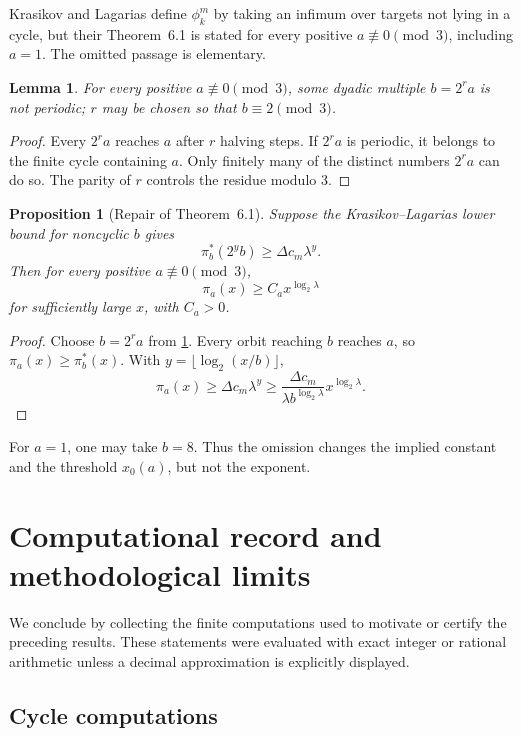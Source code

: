 \documentclass[11pt]{amsart}
\numberwithin{equation}{section}
\newtheorem{proposition}[theorem]{Proposition}
\newtheorem{lemma}[theorem]{Lemma}
\begin{document}
Krasikov and Lagarias define $\phi_k^m$ by taking an infimum over targets not lying in a cycle, but their Theorem~6.1 is stated for every positive $a\not\equiv0\pmod3$, including $a=1$.  The omitted passage is elementary.

\begin{lemma}\label{lem:dyadic-noncyclic}
For every positive $a\not\equiv0\pmod3$, some dyadic multiple $b=2^ra$ is not periodic; $r$ may be chosen so that $b\equiv2\pmod3$.
\end{lemma}

\begin{proof}
Every $2^ra$ reaches $a$ after $r$ halving steps.  If $2^ra$ is periodic, it belongs to the finite cycle containing $a$.  Only finitely many of the distinct numbers $2^ra$ can do so.  The parity of $r$ controls the residue modulo $3$.
\end{proof}

\begin{proposition}[Repair of Theorem~6.1]\label{prop:KL-repair}
Suppose the Krasikov--Lagarias lower bound for noncyclic $b$ gives
\[
\pi_b^*(2^yb)\ge\Delta c_m\lambda^y.
\]
Then for every positive $a\not\equiv0\pmod3$,
\[
\pi_a(x)\ge C_a x^{\log_2\lambda}
\]
for sufficiently large $x$, with $C_a>0$.
\end{proposition}

\begin{proof}
Choose $b=2^ra$ from \cref{lem:dyadic-noncyclic}.  Every orbit reaching $b$ reaches $a$, so $\pi_a(x)\ge\pi_b^*(x)$.  With $y=\lfloor\log_2(x/b)\rfloor$,
\[
\pi_a(x)
\ge\Delta c_m\lambda^y
\ge\frac{\Delta c_m}{\lambda b^{\log_2\lambda}}
 x^{\log_2\lambda}.
\]
\end{proof}

For $a=1$, one may take $b=8$.  Thus the omission changes the implied constant and the threshold $x_0(a)$, but not the exponent.

\section{Computational record and methodological limits}\label{sec:computations}

We conclude by collecting the finite computations used to motivate or certify the preceding results.  These statements were evaluated with exact integer or rational arithmetic unless a decimal approximation is explicitly displayed.

\subsection{Cycle computations}
\end{document}
